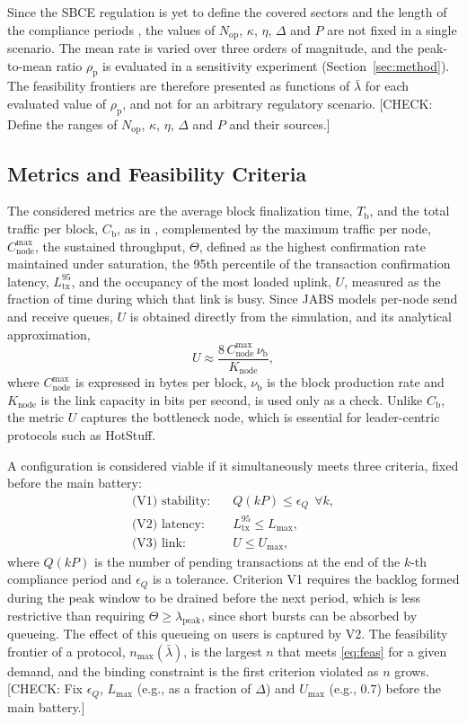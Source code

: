 \documentclass[english]{sbc2025}%
\newcommand{\chk}[1]{\textcolor{orange!80!black}{[CHECK: #1]}}
\newcommand{\Tb}{T_{\mathrm{b}}}
\newcommand{\Cb}{C_{\mathrm{b}}}
\newcommand{\Cn}{C^{\max}_{\mathrm{node}}}
\newcommand{\Lt}{L^{95}_{\mathrm{tx}}}
\newcommand{\Th}{\Theta}
\newcommand{\Ut}{U}
\newcommand{\nmax}{n_{\max}}
\newcommand{\Kn}{K_{\mathrm{node}}}
\begin{document}
Since the SBCE regulation is yet to define the covered sectors and the length of the compliance periods \citep{Lei15042}, the values of $N_{\mathrm{op}}$, $\kappa$, $\eta$, $\Delta$ and $P$ are not fixed in a single scenario. The mean rate is varied over three orders of magnitude, and the peak-to-mean ratio $\rho_{\mathrm{p}}$ is evaluated in a sensitivity experiment (Section~\ref{sec:method}). The feasibility frontiers are therefore presented as functions of $\bar{\lambda}$ for each evaluated value of $\rho_{\mathrm{p}}$, and not for an arbitrary regulatory scenario. \chk{Define the ranges of $N_{\mathrm{op}}$, $\kappa$, $\eta$, $\Delta$ and $P$ and their sources.}

\subsection{Metrics and Feasibility Criteria}

The considered metrics are the average block finalization time, $\Tb$, and the total traffic per block, $\Cb$, as in \citep{Caburlao2025reic,Caburlao2026clei}, complemented by the maximum traffic per node, $\Cn$, the sustained throughput, $\Th$, defined as the highest confirmation rate maintained under saturation, the 95th percentile of the transaction confirmation latency, $\Lt$, and the occupancy of the most loaded uplink, $\Ut$, measured as the fraction of time during which that link is busy. Since JABS models per-node send and receive queues, $\Ut$ is obtained directly from the simulation, and its analytical approximation,
\begin{equation}
\Ut \approx \frac{8\, \Cn\, \nu_{\mathrm{b}}}{\Kn},
\label{eq:util}
\end{equation}
where $\Cn$ is expressed in bytes per block, $\nu_{\mathrm{b}}$ is the block production rate and $\Kn$ is the link capacity in bits per second, is used only as a check. Unlike $\Cb$, the metric $\Ut$ captures the bottleneck node, which is essential for leader-centric protocols such as HotStuff.

A configuration is considered viable if it simultaneously meets three criteria, fixed before the main battery:
\begin{align}
\text{(V1) stability:} \quad & Q(kP) \leq \epsilon_{Q}\ \ \forall k, \nonumber\\
\text{(V2) latency:} \quad & \Lt \leq L_{\max}, \label{eq:feas}\\
\text{(V3) link:} \quad & \Ut \leq U_{\max}, \nonumber
\end{align}
where $Q(kP)$ is the number of pending transactions at the end of the $k$-th compliance period and $\epsilon_{Q}$ is a tolerance. Criterion V1 requires the backlog formed during the peak window to be drained before the next period, which is less restrictive than requiring $\Th \geq \lambda_{\mathrm{peak}}$, since short bursts can be absorbed by queueing. The effect of this queueing on users is captured by V2. The feasibility frontier of a protocol, $\nmax(\bar{\lambda})$, is the largest $n$ that meets \eqref{eq:feas} for a given demand, and the binding constraint is the first criterion violated as $n$ grows. \chk{Fix $\epsilon_{Q}$, $L_{\max}$ (e.g., as a fraction of $\Delta$) and $U_{\max}$ (e.g., $0.7$) before the main battery.}
\end{document}
